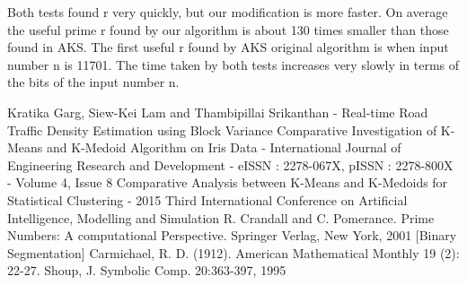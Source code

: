 \documentclass[a4paper,12pt]{article}
\begin{document}
\begin{flushleft}
	Both tests found r very quickly, but our modification is more faster. On average the useful prime r found by our algorithm is about 130 times smaller than those found in AKS. The first useful r found by AKS original algorithm is when input number n is 11701. The time taken by
both tests increases very slowly in terms of the bits of the input number n.
\end{flushleft}



\newpage
\begin{thebibliography}{9}
	Kratika Garg, Siew-Kei Lam and Thambipillai Srikanthan - Real-time Road Traffic Density Estimation using Block Variance
	Comparative Investigation of K-Means and K-Medoid Algorithm on Iris Data - International Journal of Engineering Research and Development - eISSN : 2278-067X, pISSN : 2278-800X - Volume 4, Issue 8
	Comparative Analysis between K-Means and K-Medoids for Statistical Clustering - 2015 Third International Conference on Artificial Intelligence, Modelling and Simulation
	R. Crandall and C. Pomerance. Prime Numbers: A computational Perspective.
	Springer Verlag, New York, 2001 [Binary Segmentation]
	Carmichael, R. D. (1912). American Mathematical Monthly 19 (2): 22-27.
	Shoup, J. Symbolic Comp. 20:363-397, 1995
\end{thebibliography}
\end{document}
